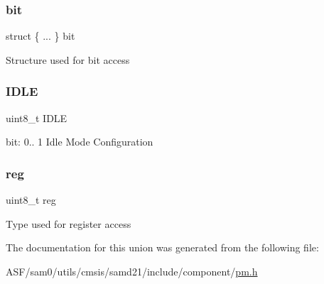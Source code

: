\subsubsection{\texorpdfstring{bit}{bit}}
{\footnotesize\ttfamily struct \{ ... \}   bit}

Structure used for bit access \mbox{\label{union_p_m___s_l_e_e_p___type_ae30a73e18e1fdd27774cf45972e90c99}} 
\subsubsection{\texorpdfstring{IDLE}{IDLE}}
{\footnotesize\ttfamily uint8\+\_\+t I\+D\+LE}

bit\+: 0.. 1 Idle Mode Configuration \mbox{\label{union_p_m___s_l_e_e_p___type_a9428adc9af4653a2050e2536b55dec8d}} 
\subsubsection{\texorpdfstring{reg}{reg}}
{\footnotesize\ttfamily uint8\+\_\+t reg}

Type used for register access 

The documentation for this union was generated from the following file\+:\begin{DoxyCompactItemize}
\item 
A\+S\+F/sam0/utils/cmsis/samd21/include/component/\mbox{\hyperlink{component_2pm_8h}{pm.\+h}}\end{DoxyCompactItemize}
